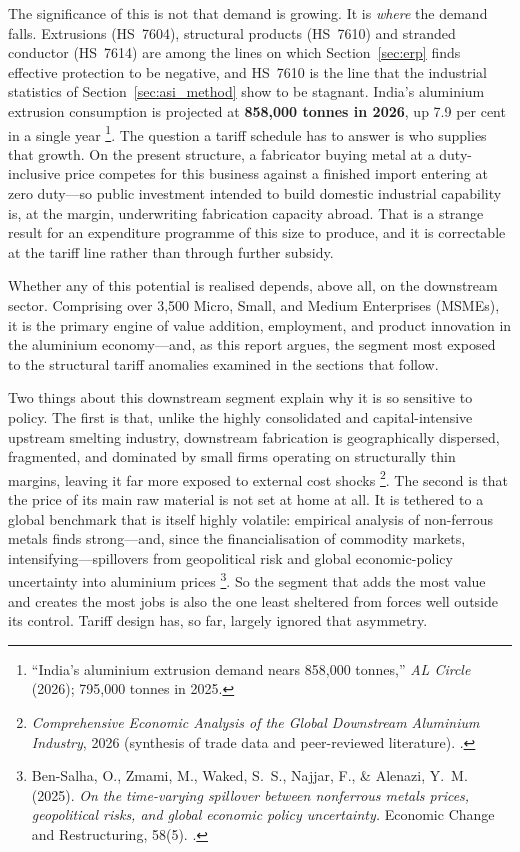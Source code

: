 \documentclass[11pt, a4paper]{article}
\numberwithin{figure}{section}
\numberwithin{table}{section}
\begin{document}
The significance of this is not that demand is growing. It is \emph{where} the demand
falls. Extrusions (HS~7604), structural products (HS~7610) and stranded conductor
(HS~7614) are among the lines on which Section~\ref{sec:erp} finds effective protection
to be negative, and HS~7610 is the line that the industrial statistics of
Section~\ref{sec:asi_method} show to be stagnant. India's aluminium extrusion
consumption is projected at \textbf{858,000 tonnes in 2026}, up 7.9 per cent in a single
year \cite{alcircle2026b}\footnote{``India's aluminium extrusion demand nears 858,000
tonnes,'' \textit{AL Circle} (2026); 795,000 tonnes in 2025.}. The question a tariff
schedule has to answer is who supplies that growth. On the present structure, a
fabricator buying metal at a duty-inclusive price competes for this business against a
finished import entering at zero duty---so public investment intended to build domestic
industrial capability is, at the margin, underwriting fabrication capacity abroad. That
is a strange result for an expenditure programme of this size to produce, and it is
correctable at the tariff line rather than through further subsidy.

Whether any of this potential is realised depends, above all, on the downstream sector. Comprising over 3,500 Micro, Small, and Medium Enterprises (MSMEs), it is the primary engine of value addition, employment, and product innovation in the aluminium economy---and, as this report argues, the segment most exposed to the structural tariff anomalies examined in the sections that follow. 

Two things about this downstream segment explain why it is so sensitive to policy. The first is that, unlike the highly consolidated and capital-intensive upstream smelting industry, downstream fabrication is geographically dispersed, fragmented, and dominated by small firms operating on structurally thin margins, leaving it far more exposed to external cost shocks \cite{costreg2026}\footnote{\textit{Comprehensive Economic Analysis of the Global Downstream Aluminium Industry}, 2026 (synthesis of trade data and peer-reviewed literature). \cite{costreg2026}.}. The second is that the price of its main raw material is not set at home at all. It is tethered to a global benchmark that is itself highly volatile: empirical analysis of non-ferrous metals finds strong---and, since the financialisation of commodity markets, intensifying---spillovers from geopolitical risk and global economic-policy uncertainty into aluminium prices \cite{bensalha2025}\footnote{Ben-Salha, O., Zmami, M., Waked, S.~S., Najjar, F., \& Alenazi, Y.~M. (2025). \textit{On the time-varying spillover between nonferrous metals prices, geopolitical risks, and global economic policy uncertainty.} Economic Change and Restructuring, 58(5). \cite{bensalha2025}.}. So the segment that adds the most value and creates the most jobs is also the one least sheltered from forces well outside its control. Tariff design has, so far, largely ignored that asymmetry. 
\end{document}
